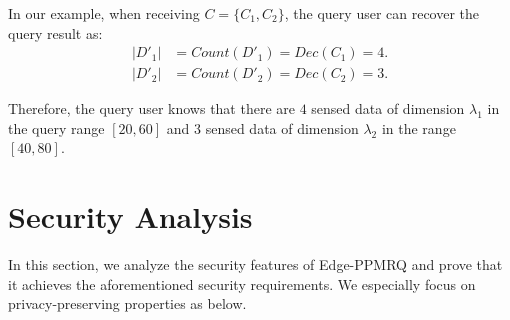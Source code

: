 \documentclass[IEEE JOURNAL OF BIOMEDICAL AND HEALTH INFORMATICS]{IEEEtran}
\begin{document}
In our example, when receiving $C=\{C_1, C_2\}$, the query user can recover the query result as:
 \begin{align*}
 |D'_1| &= Count(D'_1) = Dec(C_1)=4. \\
 |D'_2| &= Count(D'_2) = Dec(C_2)=3. 
 \end{align*}
 
 Therefore, the query user knows that there are $4$ sensed data of dimension $\lambda_1$ in the query range $[20, 60]$ and $3$ sensed data of dimension $\lambda_2$ in the range $[40, 80]$.

\section{Security Analysis}
In this section, we analyze the security features of Edge-PPMRQ and prove that it achieves the aforementioned security requirements. We especially focus on privacy-preserving properties as below.
\end{document}

